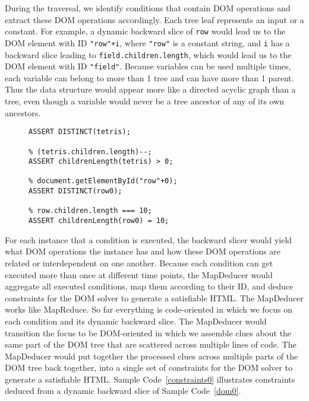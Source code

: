 During the traversal, we identify conditions that contain DOM operations and extract these DOM operations accordingly.  Each tree leaf represents an input or a constant.  
For example, a dynamic backward slice of {\tt row} would lead us to the DOM element with ID {\tt "row"+i}, where {\tt "row"} is a constant string, and {\tt i} has a backward slice leading to {\tt field.children.length}, which would lead us to the DOM element with ID {\tt "field"}.  
Because variables can be used multiple times, each variable can belong to more than 1 tree and can have more than 1 parent.  Thus the data structure would appear more like a directed acyclic graph than a tree, even though a variable would never be a tree ancestor of any of its own ancestors.  

\begin{figure}
\begin{lstlisting}[caption=DOM constraints for generating an HTML that would satisfy for going the {\tt True} branch in the {\tt if} statement of Sample Code ~\ref{dom0}.  The constraints are shown in the input format for the CVC~\cite{cvc3} implementation of the SMT solver. "\%" is the comment operator in CVC.,label=constraints0]
% document.getElementById("tetris");
ASSERT DISTINCT(tetris);

% (tetris.children.length)--;
ASSERT childrenLength(tetris) > 0;

% document.getElementById("row"+0);
ASSERT DISTINCT(row0);

% row.children.length === 10;
ASSERT childrenLength(row0) = 10;

\end{lstlisting}
\end{figure}

For each instance that a condition is executed, the backward slicer would yield what DOM operations the instance has and how these DOM operations are related or interdependent on one another.  
Because each condition can get executed more than once at different time points, the MapDeducer would aggregate all executed conditions, map them according to their ID, and deduce constraints for the DOM solver to generate a satisfiable HTML.  
The MapDeducer works like MapReduce.  So far everything is code-oriented in which we focus on each condition and its dynamic backward slice.  The MapDeducer would transition the focus to be DOM-oriented in which we assemble clues about the same part of the DOM tree that are scattered across multiple lines of code.  
The MapDeducer would put together the processed clues across multiple parts of the DOM tree back together, into a single set of constraints for the DOM solver to generate a satisfiable HTML.
Sample Code~\ref{constraints0} illustrates constraints deduced from a dynamic backward slice of Sample Code~\ref{dom0}. 

